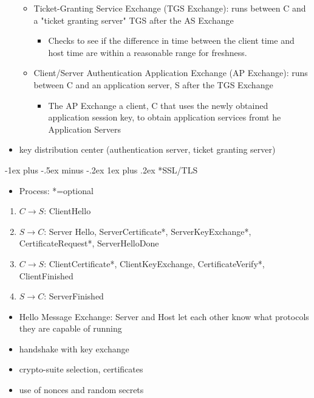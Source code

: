 \documentclass[3pt,landscape]{article}
\makeatletter
\renewcommand{\subsubsection}{\@startsection{subsubsection}{3}{0mm}%
                            {-1ex plus -.5ex minus -.2ex}%
                            {1ex plus .2ex}%
                            {\normalfont\small\bfseries}}
\makeatother
\begin{document}
\begin{multicols}{3}
\begin{itemize}
\begin{itemize}
            \item Ticket-Granting Service Exchange (TGS Exchange): runs between C and a "ticket granting server" TGS after the AS Exchange
                \begin{itemize}
                    \item Checks to see if the difference in time between the client time and host time are within a reasonable range for freshness.
                \end{itemize}
            \item Client/Server Authentication Application Exchange (AP Exchange): runs between C and an application server, S after the TGS Exchange
                \begin{itemize}
                    \item The AP Exchange a client, C that uses the newly obtained application session key, to obtain application services fromt he Application Servers
                \end{itemize}
        \end{itemize}
    \item key distribution center (authentication server, ticket granting server)
\end{itemize}

\subsubsection*{SSL/TLS}
\begin{itemize}
    \item Process: *=optional
\end{itemize}
\begin{enumerate}
    \item \(C \rightarrow S\): ClientHello
    \item \(S \rightarrow C\): Server Hello, ServerCertificate*, ServerKeyExchange*, CertificateRequest*, ServerHelloDone
    \item \(C \rightarrow S\): ClientCertificate*, ClientKeyExchange, CertificateVerify*, ClientFinished
    \item \(S \rightarrow C\): ServerFinished
\end{enumerate}
\begin{itemize}
    \item Hello Message Exchange: Server and Host let each other know what protocols they are capable of running
    \item handshake with key exchange
    \item crypto-suite selection, certificates
    \item use of nonces and random secrets
\end{itemize}


\end{multicols}
\end{document}
